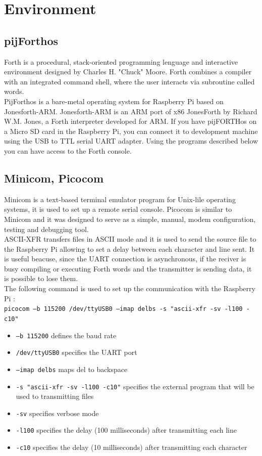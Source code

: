 \documentclass[]{article}
\begin{document}
\section{Environment}

\subsection{pijForthos}
Forth is a procedural, stack-oriented programming lenguage and interactive environment designed by Charles H. "Chuck" Moore. Forth combines
a compiler with an integrated command shell, where the user interacts via subroutine called words. \\
PijForthos is a bare-metal operating system for Raspberry Pi based on Jonesforth-ARM. Jonesforth-ARM is an ARM port of x86 JonesForth 
by Richard W.M. Jones, a Forth interpreter developed for ARM. If you have pijFORTHos on a Micro SD card in the Raspberry Pi, you can connect
it to development machine using the USB to TTL serial UART adapter. Using the programs described below you can have access to 
the Forth console.


\subsection{Minicom, Picocom}
Minicom is a text-based terminal emulator program for Unix-lile operating systems, it is used to set up a remote serial console.
Picocom is similar to Minicom and it was designed to serve as a simple, manual, modem configuration, testing and debugging tool. \\
ASCII-XFR transfers files in ASCII mode and it is used to send the source file to the Raspberry Pi allowing to set a delay between each character and line sent. It is useful
beacuse, since the UART connection is asynchronous, if the reciver is busy compiling or executing Forth words and the transmitter is sending data,
it is possible to lose them.  \\
The following command is used to set up the communication with the Raspberry Pi : \\
\texttt{picocom --b 115200 /dev/ttyUSB0 --imap delbs -s "ascii-xfr -sv -l100 -c10"}

\begin{itemize}
    \item \texttt{--b 115200} defines the baud rate
    \item \texttt{/dev/ttyUSB0} specifies the UART port
    \item \texttt{--imap delbs} maps del to backspace
    \item \texttt{-s "ascii-xfr -sv -l100 -c10"} specifies the external program that will be used to transmitting files
    \item \texttt{-sv} specifies verbose mode 
    \item \texttt{-l100} specifies the delay (100 milliseconds) after transmitting each line
    \item \texttt{-c10} specifies the delay (10 milliseconds) after transmitting each character
\end{itemize}
\end{document}
